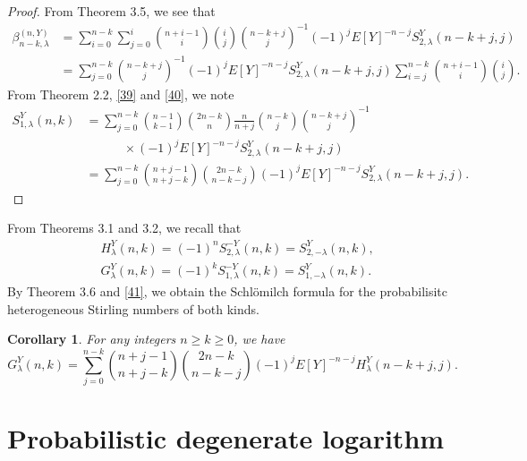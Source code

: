 \documentclass[a4paper,11pt]{amsart}
\newtheorem{corollary}[theorem]{Corollary}
\begin{document}
\begin{proof}
From Theorem 3.5, we see that 
\begin{equation} \label{40}
\begin{aligned}
\beta_{n-k,\lambda}^{(n,Y)}&=\sum_{i=0}^{n-k}\sum_{j=0}^{i}\binom{n+i-1}{i}\binom{i}{j}\binom{n-k+j}{j}^{-1}(-1)^{j}E[Y]^{-n-j}S_{2,\lambda}^{Y}(n-k+j,j) \\
&=\sum_{j=0}^{n-k}\binom{n-k+j}{j}^{-1}(-1)^{j}E[Y]^{-n-j}S_{2,\lambda}^{Y}(n-k+j,j)\sum_{i=j}^{n-k}\binom{n+i-1}{i}\binom{i}{j}.
\end{aligned}
\end{equation}
From Theorem 2.2, \eqref{39} and \eqref{40}, we note
\begin{align*}
S_{1,\lambda}^{Y}(n,k)&=\sum_{j=0}^{n-k}\binom{n-1}{k-1}\binom{2n-k}{n}\frac{n}{n+j}\binom{n-k}{j}\binom{n-k+j}{j}^{-1}\\
&\quad\quad\quad \times (-1)^{j}E[Y]^{-n-j}S_{2,\lambda}^{Y}(n-k+j,j) \\
&=\sum_{j=0}^{n-k} \binom{n+j-1}{n+j-k}\binom{2n-k}{n-k-j}(-1)^{j}E[Y]^{-n-j}S_{2,\lambda}^{Y}(n-k+j,j).
\end{align*}
\end{proof}
From Theorems 3.1 and 3.2, we recall that 
\begin{equation}  \label{41}
\begin{aligned}
&H_{\lambda}^{Y}(n,k)=(-1)^{n}S_{2,\lambda}^{-Y}(n,k)=S_{2,-\lambda}^{Y}(n,k),\\ &G_{\lambda}^{Y}(n,k)=(-1)^{k}S_{1,\lambda}^{-Y}(n,k)=S_{1,-\lambda}^{Y}(n,k).
\end{aligned}
\end{equation}
By Theorem 3.6 and \eqref{41}, we obtain the Schl\"omilch formula for the probabilisitc heterogeneous Stirling numbers of both kinds.
\begin{corollary}
For any integers $n \ge k \ge 0$, we have
\begin{equation*}
G_{\lambda}^{Y}(n,k)=\sum_{j=0}^{n-k}\binom{n+j-1}{n+j-k}\binom{2n-k}{n-k-j}(-1)^{j}E[Y]^{-n-j}H_{\lambda}^{Y}(n-k+j,j).
\end{equation*}
\end{corollary}

\section{Probabilistic degenerate logarithm}
\end{document}
